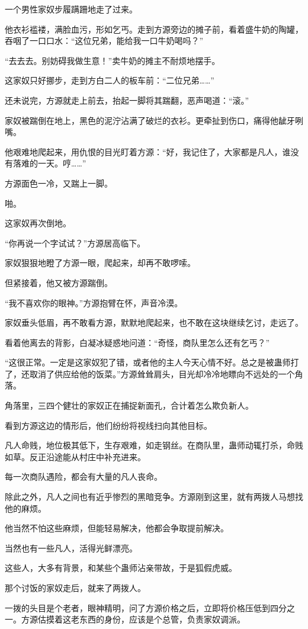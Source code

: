 \begin{this_body}
一个男性家奴步履蹒跚地走了过来。

他衣衫褴褛，满脸血污，形如乞丐。走到方源旁边的摊子前，看着盛牛奶的陶罐，吞咽了一口口水：“这位兄弟，能给我一口牛奶喝吗？”

“去去去。别妨碍我做生意！”卖牛奶的摊主不耐烦地摆手。

这家奴只好挪步，走到方白二人的板车前：“二位兄弟……”

还未说完，方源就走上前去，抬起一脚将其踹翻，恶声喝道：“滚。”

家奴被踹倒在地上，黑色的泥泞沾满了破烂的衣衫。更牵扯到伤口，痛得他龇牙咧嘴。

他艰难地爬起来，用仇恨的目光盯着方源：“好，我记住了，大家都是凡人，谁没有落难的一天。哼……”

方源面色一冷，又踹上一脚。

啪。

这家奴再次倒地。

“你再说一个字试试？”方源居高临下。

家奴狠狠地瞪了方源一眼，爬起来，却再不敢啰嗦。

但紧接着，他又被方源踹倒。

“我不喜欢你的眼神。”方源抱臂在怀，声音冷漠。

家奴垂头低眉，再不敢看方源，默默地爬起来，也不敢在这块继续乞讨，走远了。

看着他离去的背影，白凝冰疑惑地问道：“奇怪，商队里怎么还有乞丐？”

“这很正常。一定是这家奴犯了错，或者他的主人今天心情不好。总之是被蛊师打了，还取消了供应给他的饭菜。”方源耸耸肩头，目光却冷冷地瞟向不远处的一个角落。

角落里，三四个健壮的家奴正在捕捉新面孔，合计着怎么欺负新人。

看到方源这边的情形后，他们纷纷将视线扫向其他目标。

凡人命贱，地位极其低下，生存艰难，如走钢丝。在商队里，蛊师动辄打杀，命贱如草。反正沿途能从村庄中补充进来。

每一次商队遇险，都会有大量的凡人丧命。

除此之外，凡人之间也有近乎惨烈的黑暗竞争。方源刚到这里，就有两拨人马想找他的麻烦。

他当然不怕这些麻烦，但能轻易解决，他都会争取提前解决。

当然也有一些凡人，活得光鲜漂亮。

这些人，大多有背景，和某些个蛊师沾亲带故，于是狐假虎威。

那个讨饭的家奴走后，就来了两拨人。

一拨的头目是个老者，眼神精明，问了方源价格之后，立即将价格压低到四分之一。方源估摸着这老东西的身份，应该是个总管，负责家奴调派。


\end{this_body}
